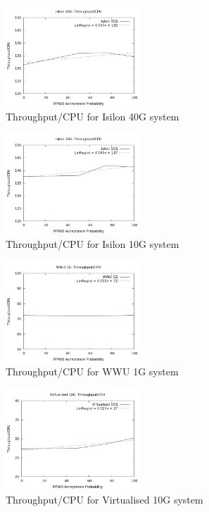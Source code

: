 \documentclass[journal]{IEEEtran}
\begin{document}
    \begin{figure}[h]
      \includegraphics[width=0.45\textwidth]{toc_isilon40}
      \caption{Throughput/CPU for Isilon 40G system}
      \label{fig:isilontoc40}
    \end{figure}
    \begin{figure}[h]
      \includegraphics[width=0.45\textwidth]{toc_isilon10}
      \caption{Throughput/CPU for Isilon 10G system}
      \label{fig:isilontoc10}
    \end{figure}
    \begin{figure}[h]
      \includegraphics[width=0.45\textwidth]{toc_wwu1}
      \caption{Throughput/CPU for WWU 1G system}
      \label{fig:wwutoc1}
    \end{figure}
    \begin{figure}[h]
      \includegraphics[width=0.45\textwidth]{toc_virtual10}
      \caption{Throughput/CPU for Virtualised 10G system}
      \label{fig:virtualtoc10}
    \end{figure}
    
\end{document}
